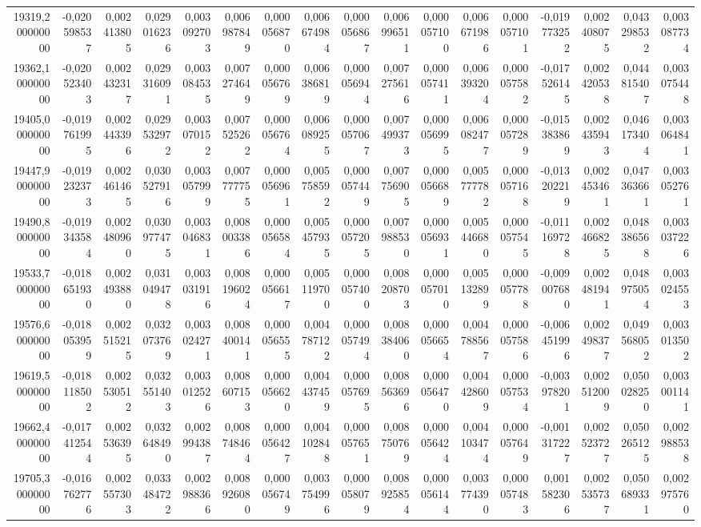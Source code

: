 \begin{longtable}{rrrrrrrrrrrrrrrrr}
19319,200000000 & -0,020598537 & 0,002413805 & 0,029016236 & 0,003092703 & 0,006987849 & 0,000056870 & 0,006674984 & 0,000056867 & 0,006996511 & 0,000057100 & 0,006671986 & 0,000057101 & -0,019773252 & 0,002408075 & 0,043298532 & 0,003087734\\
19362,100000000 & -0,020523403 & 0,002432317 & 0,029316091 & 0,003084535 & 0,007274649 & 0,000056769 & 0,006386819 & 0,000056944 & 0,007275616 & 0,000057411 & 0,006393204 & 0,000057582 & -0,017526145 & 0,002420538 & 0,044815407 & 0,003075448\\
19405,000000000 & -0,019761995 & 0,002443396 & 0,029532972 & 0,003070152 & 0,007525262 & 0,000056764 & 0,006089255 & 0,000057067 & 0,007499373 & 0,000056995 & 0,006082477 & 0,000057289 & -0,015383869 & 0,002435943 & 0,046173404 & 0,003064841\\
19447,900000000 & -0,019232373 & 0,002461465 & 0,030527916 & 0,003057999 & 0,007777755 & 0,000056961 & 0,005758592 & 0,000057449 & 0,007756905 & 0,000056689 & 0,005777782 & 0,000057168 & -0,013202219 & 0,002453461 & 0,047363661 & 0,003052761\\
19490,800000000 & -0,019343584 & 0,002480960 & 0,030977475 & 0,003046831 & 0,008003386 & 0,000056584 & 0,005457935 & 0,000057205 & 0,007988530 & 0,000056931 & 0,005446680 & 0,000057545 & -0,011169728 & 0,002466825 & 0,048386568 & 0,003037226\\
19533,700000000 & -0,018651930 & 0,002493880 & 0,031049478 & 0,003031916 & 0,008196024 & 0,000056617 & 0,005119700 & 0,000057400 & 0,008208703 & 0,000057010 & 0,005132899 & 0,000057788 & -0,009007680 & 0,002481941 & 0,048975054 & 0,003024553\\
19576,600000000 & -0,018053959 & 0,002515215 & 0,032073769 & 0,003024271 & 0,008400141 & 0,000056555 & 0,004787122 & 0,000057494 & 0,008384060 & 0,000056654 & 0,004788567 & 0,000057586 & -0,006451996 & 0,002498377 & 0,049568052 & 0,003013502\\
19619,500000000 & -0,018118502 & 0,002530512 & 0,032551403 & 0,003012526 & 0,008607153 & 0,000056620 & 0,004437459 & 0,000057695 & 0,008563696 & 0,000056470 & 0,004428609 & 0,000057534 & -0,003978201 & 0,002512009 & 0,050028250 & 0,003001141\\
19662,400000000 & -0,017412544 & 0,002536395 & 0,032648490 & 0,002994387 & 0,008748464 & 0,000056427 & 0,004102848 & 0,000057651 & 0,008750769 & 0,000056424 & 0,004103474 & 0,000057649 & -0,001317227 & 0,002523727 & 0,050265125 & 0,002988538\\
19705,300000000 & -0,016762776 & 0,002557303 & 0,033484722 & 0,002988366 & 0,008926080 & 0,000056749 & 0,003754996 & 0,000058079 & 0,008925854 & 0,000056144 & 0,003774390 & 0,000057483 & 0,001582306 & 0,002535737 & 0,050689331 & 0,002975760\\

\end{longtable}
